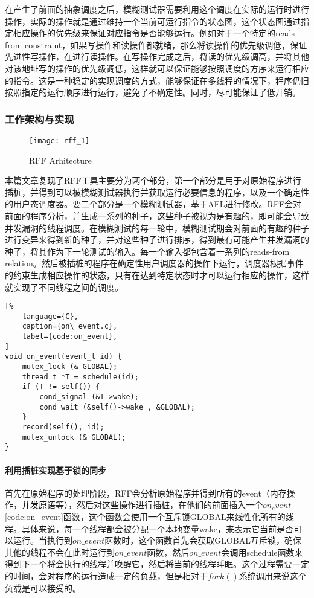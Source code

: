 在产生了前面的抽象调度之后，模糊测试器需要利用这个调度在实际的运行时进行操作，实际的操作就是通过维持一个当前可运行指令的状态图，这个状态图通过指定相应操作的优先级来保证对应指令是否能够运行。例如对于一个特定的reads-from constraint，如果写操作和读操作都就绪，那么将读操作的优先级调低，保证先进性写操作，在进行读操作。在写操作完成之后，将读的优先级调高，并将其他对该地址写的操作的优先级调低，这样就可以保证能够按照调度的方序来运行相应的指令。这是一种稳定的实现调度的方式，能够保证在多线程的情况下，程序仍旧按照指定的运行顺序进行运行，避免了不确定性。同时，尽可能保证了低开销。

\subsubsection{工作架构与实现}

\begin{figure}[ht]
    \centering
    \texttt{[image: rff\_1]}
    \caption{\label{fig:rff}RFF Arhitecture}
\end{figure}

本篇文章复现了RFF工具主要分为两个部分，第一个部分是用于对原始程序进行插桩，并得到可以被模糊测试器执行并获取运行必要信息的程序，以及一个确定性的用户态调度器。要二个部分是一个模糊测试器，基于AFL进行修改。RFF会对前面的程序分析，并生成一系列的种子，这些种子被视为是有趣的，即可能会导致并发漏洞的线程调度。在模糊测试的每一轮中，模糊测试期会对前面的有趣的种子进行变异来得到新的种子，并对这些种子进行排序，得到最有可能产生并发漏洞的种子，将其作为下一轮测试的输入。每一个输入都包含着一系列的reads-from relation。然后被插桩的程序在确定性用户调度器的操作下运行，调度器根据事件的约束生成相应操作的状态，只有在达到特定状态时才可以运行相应的操作，这样就实现了不同线程之间的调度。

\begin{spacing}{1.0}
\begin{lstlisting}[%
    language={C},
    caption={on\_event.c},
    label={code:on_event},
]
void on_event(event_t id) {
    mutex_lock (& GLOBAL);
    thread_t *T = schedule(id);
    if (T != self()) {
        cond_signal (&T->wake);
        cond_wait (&self()->wake , &GLOBAL);
    }
    record(self(), id);
    mutex_unlock (& GLOBAL);
}
\end{lstlisting}
\end{spacing}

\paragraph{利用插桩实现基于锁的同步}首先在原始程序的处理阶段，RFF会分析原始程序并得到所有的event（内存操作，并发原语等），然后对这些操作进行插桩，在他们的前面插入一个$on_event$\autoref{code:on_event}函数，这个函数会使用一个互斥锁GLOBAL来线性化所有的线程。具体来说，每一个线程都会被分配一个本地变量wake，来表示它当前是否可以运行。当执行到$on\_event$函数时，这个函数首先会获取GLOBAL互斥锁，确保其他的线程不会在此时运行到$on\_event$函数，然后$on\_event$会调用schedule函数来得到下一个将会执行的线程并唤醒它，然后将当前的线程睡眠。这个过程需要一定的时间，会对程序的运行造成一定的负载，但是相对于$fork()$系统调用来说这个负载是可以接受的\cite{ba2022efficient, gao2021scalable, jeon2020fuzzan}。

